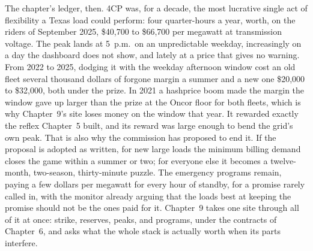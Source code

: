 \bigskip

The chapter's ledger, then. 4CP was, for a decade, the most lucrative single act of flexibility a Texas load could perform: four quarter-hours a year, worth, on the riders of September 2025, \$40,700 to \$66,700 per megawatt at transmission voltage. The peak lands at 5~p.m.\ on an unpredictable weekday, increasingly on a day the dashboard does not show, and lately at a price that gives no warning. %
From 2022 to 2025, dodging it with the weekday afternoon window cost an old fleet several thousand dollars of forgone margin a summer and a new one \$20,000 to \$32,000, both under the prize. In 2021 a hashprice boom made the margin the window gave up larger than the prize at the Oncor floor for both fleets, which is why Chapter~9's site loses money on the window that year. %
It rewarded exactly the reflex Chapter~5 built, and its reward was large enough to bend the grid's own peak. That is also why the commission has proposed to end it. If the proposal is adopted as written, for new large loads the minimum billing demand closes the game within a summer or two; for everyone else it becomes a twelve-month, two-season, thirty-minute puzzle. The emergency programs remain, paying a few dollars per megawatt for every hour of standby, for a promise rarely called in, with the monitor already arguing that the loads best at keeping the promise should not be the ones paid for it. Chapter~9 takes one site through all of it at once: strike, reserves, peaks, and programs, under the contracts of Chapter~6, and asks what the whole stack is actually worth when its parts interfere.
